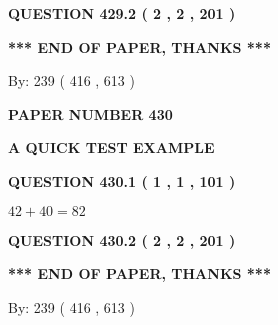 \documentclass[12pt]{article}
\begin{document}
{\textbf{\Large{QUESTION
429.2 
 ( 2 , 2 , 201 )
}}}
  
  
   
   
 \vspace{0.2in}
 
   
   
   
   
\vspace{1.0in} 
{\textbf{\large{ *** END OF PAPER, THANKS *** }}} 
   
   
\hspace{1.0in} By: 
 239 ( 416 ,  613 )
   
   
   
   
\newpage 
\setcounter{page}{ 
   430001 } 
   
   
   
   
 {\textbf{ \Large{ PAPER NUMBER  430  }}}
   
   
\vspace{0.2in}
   
   
   
   
   
   
 \vspace{0.2in}
{\LARGE {\textbf{ A QUICK TEST EXAMPLE}}}
   
   
  
\vspace{0.2in}
  
{\textbf{\Large{QUESTION
430.1 
 ( 1 , 1 , 101 )
}}}
  
  
 
 

$ %
42 +  %
40=   %
82$
 
 
  
\vspace{0.2in}
  
{\textbf{\Large{QUESTION
430.2 
 ( 2 , 2 , 201 )
}}}
  
  
   
   
 \vspace{0.2in}
 
   
   
   
   
\vspace{1.0in} 
{\textbf{\large{ *** END OF PAPER, THANKS *** }}} 
   
   
\hspace{1.0in} By: 
 239 ( 416 ,  613 )
   
   
   
   
\newpage 
\setcounter{page}{ 
   431001 } 
   
\end{document}
